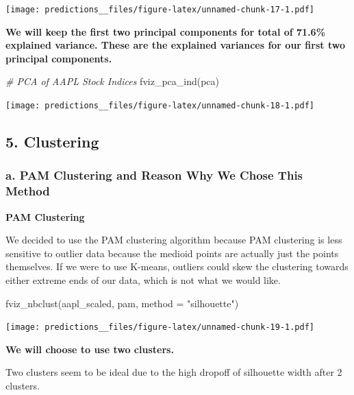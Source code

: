 \documentclass[
]{article}
\newenvironment{Shaded}{\begin{snugshade}}{\end{snugshade}}
\newcommand{\AttributeTok}[1]{\textcolor[rgb]{0.77,0.63,0.00}{#1}}
\newcommand{\CommentTok}[1]{\textcolor[rgb]{0.56,0.35,0.01}{\textit{#1}}}
\newcommand{\FunctionTok}[1]{\textcolor[rgb]{0.00,0.00,0.00}{#1}}
\newcommand{\NormalTok}[1]{#1}
\newcommand{\StringTok}[1]{\textcolor[rgb]{0.31,0.60,0.02}{#1}}
\begin{document}
\texttt{[image: predictions\_\_files/figure-latex/unnamed-chunk-17-1.pdf]}

\textbf{We will keep the first two principal components for total of
71.6\% explained variance. These are the explained variances for our
first two principal components.}

\begin{Shaded}
\begin{Highlighting}[]
\CommentTok{\# PCA of AAPL Stock Indices}
\FunctionTok{fviz\_pca\_ind}\NormalTok{(pca) }
\end{Highlighting}
\end{Shaded}

\texttt{[image: predictions\_\_files/figure-latex/unnamed-chunk-18-1.pdf]}

\hypertarget{clustering}{%
\subsection{5. Clustering}\label{clustering}}

\hypertarget{a.-pam-clustering-and-reason-why-we-chose-this-method}{%
\subsubsection{a. PAM Clustering and Reason Why We Chose This
Method}\label{a.-pam-clustering-and-reason-why-we-chose-this-method}}

\textbf{PAM Clustering}

We decided to use the PAM clustering algorithm because PAM clustering is
less sensitive to outlier data because the medioid points are actually
just the points themselves. If we were to use K-means, outliers could
skew the clustering towards either extreme ends of our data, which is
not what we would like.

\begin{Shaded}
\begin{Highlighting}[]
\FunctionTok{fviz\_nbclust}\NormalTok{(aapl\_scaled, pam, }\AttributeTok{method =} \StringTok{"silhouette"}\NormalTok{)}
\end{Highlighting}
\end{Shaded}

\texttt{[image: predictions\_\_files/figure-latex/unnamed-chunk-19-1.pdf]}

\textbf{We will choose to use two clusters.}

Two clusters seem to be ideal due to the high dropoff of silhouette
width after 2 clusters.
\end{document}
